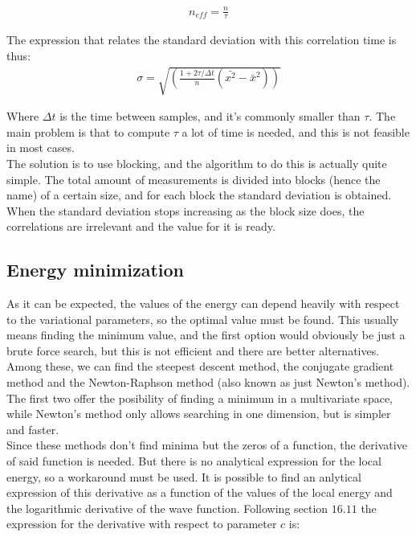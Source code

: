 		\begin{align}
			n_{eff}=\frac{n}{\tau}
		\end{align}

		The expression that relates the standard deviation with this correlation time is thus:\\

		\begin{align}
			\sigma=\sqrt{\left(\frac{1+2\tau/\Delta t}{n}\left(\bar{x^2}-\bar{x}^2\right)\right)}
		\end{align}

		Where $\Delta t$ is the time between samples, and it's commonly smaller than $\tau$. The main problem is that to compute $\tau$ a lot of time is needed, and this is not feasible in most cases.\\

		The solution is to use blocking, and the algorithm to do this is actually quite simple. The total amount of measurements is divided into blocks (hence the name) of a certain size, and for each block the standard deviation is obtained. When the standard deviation stops increasing as the block size does, the correlations are irrelevant and the value for it is ready.\\

	\subsection{Energy minimization}
		As it can be expected, the values of the energy can depend heavily with respect to the variational parameters, so the optimal value must be found. This usually means finding the minimum value, and the first option would obviously be just a brute force search, but this is not efficient and there are better alternatives. Among these, we can find the steepest descent method, the conjugate gradient method and the Newton-Raphson method (also known as just Newton's method). The first two offer the posibility of finding a minimum in a multivariate space, while Newton's method only allows searching in one dimension, but is simpler and faster.\\

		Since these methods don't find minima but the zeros of a function, the derivative of said function is needed. But there is no analytical expression for the local energy, so a workaround must be used. It is possible to find an anlytical expression of this derivative as a function of the values of the local energy and the logarithmic derivative of the wave function. Following \parencite{mortens_notes} section $16.11$ the expression for the derivative with respect to parameter $c$ is:\\

